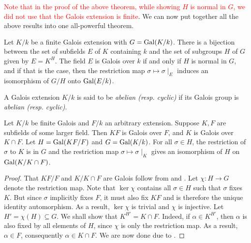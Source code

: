\textcolor{red}{Note that in the proof of the above theorem, while showing $H$ is normal in $G$, we did not use that the Galois extension is finite}. We can now put together all the above results into one all-powerful theorem.

\begin{theorem}
    Let $K/k$ be a finite Galois extension with $G = \operatorname{Gal}(K/k)$. There is a bijection between the set of subfields $E$ of $K$ containing $k$ and the set of subgroups $H$ of $G$ given by $E = K^H$. The field $E$ is Galois over $k$ if and only if $H$ is normal in $G$, and if that is the case, then the restriction map $\sigma\mapsto\sigma\mid_E$ induces an isomorphism of $G/H$ onto $\operatorname{Gal}(E/k)$.
\end{theorem}

\begin{definition}
    A Galois extension $K/k$ is said to be \textit{abelian (resp. cyclic)} if its Galois group is \textit{abelian (resp. cyclic)}.
\end{definition}

\begin{theorem}
    Let $K/k$ be finite Galois and $F/k$ an arbitrary extension. Suppose $K, F$ are subfields of some larger field. Then $KF$ is Galois over $F$, and $K$ is Galois over $K\cap F$. Let $H = \operatorname{Gal}(KF/F)$ and $G = \operatorname{Gal}(K/k)$. For all $\sigma\in H$, the restriction of $\sigma$ to $K$ is in $G$ and the restriction map $\sigma\mapsto\sigma\mid_K$ gives an isomorphism of $H$ on $\operatorname{Gal}(K/K\cap F)$.
\end{theorem}
\begin{proof}
    That $KF/F$ and $K/K\cap F$ are Galois follow from  and . Let $\chi: H\to G$ denote the restriction map. Note that $\ker\chi$ contains all $\sigma\in H$ such that $\sigma$ fixes $K$. But since $\sigma$ implicitly fixes $F$, it must also fix $KF$ and is therefore the unique identity automorphism. As a result, $\ker\chi$ is trivial and $\chi$ is injective. Let $H' = \chi(H)\subseteq G$. We shall show that $K^{H'} = K\cap F$. Indeed, if $\alpha\in K^{H'}$, then $\alpha$ is also fixed by all elements of $H$, since $\chi$ is only the restriction map. As a result, $\alpha\in F$, consequently $\alpha\in K\cap F$. We are now done due to .
\end{proof}